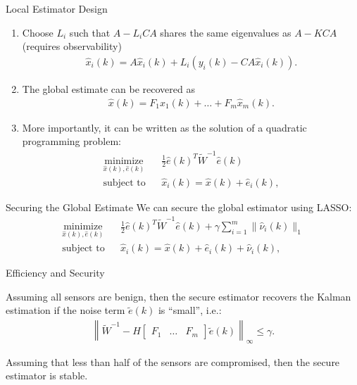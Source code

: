 \documentclass[10pt]{beamer}
\begin{document}
\begin{frame}{Local Estimator Design}
  \begin{enumerate}
  \item  Choose $L_i$ such that $A-L_iCA$ shares the same eigenvalues as $A-KCA$ (requires observability)
    \begin{align*}
      \hat x_i(k) = A \hat x_i(k) + L_i (y_i(k)-CA\hat x_i(k)).
    \end{align*}  
  \item The global estimate can be recovered as
    \begin{align*}
      \hat x(k) = F_1\hat x_1(k)+\dots+F_m\hat x_m(k).
    \end{align*}
  \item More importantly, it can be written as the solution of a quadratic programming problem:
    \begin{align*}
      &\mathop{\textrm{minimize}}\limits_{\hat x(k),\hat e(k)}&
      & \frac{1}{2}\hat e(k)^T \tilde W^{-1} \hat e(k)\\
      &\textrm{subject to} &
      &\hat x_i(k)  =  \hat x(k) + \hat e_i(k),&
    \end{align*}
  \end{enumerate}
\end{frame}

\begin{frame}{Securing the Global Estimate}
  We can secure the global estimator using LASSO:
  \begin{align*}
    &\mathop{\textrm{minimize}}\limits_{\hat x(k),\hat e(k)}&
    & \frac{1}{2}\hat e(k)^T \tilde W^{-1} \hat e(k) + \gamma \sum_{i=1}^m \|\hat \nu_i(k)\|_1\\
    &\textrm{subject to} &
    &\hat x_i(k)  =  \hat x(k) + \hat e_i(k)+\hat \nu_i(k),&
  \end{align*}
\end{frame}

\begin{frame}{Efficiency and Security}
  \begin{theorem}
    Assuming all sensors are benign, then the secure estimator recovers the Kalman estimation if the noise term $\tilde e(k)$ is ``small'', i.e.:
    \begin{align*}
      \left\|\tilde W^{-1} - H \begin{bmatrix}
          F_1&\dots&F_m
        \end{bmatrix}\tilde e(k) \right\|_\infty\leq \gamma.  
    \end{align*}
  \end{theorem}
  \begin{theorem}
    Assuming that less than half of the sensors are compromised, then the secure estimator is stable.
  \end{theorem}
\end{frame}
\end{document}
